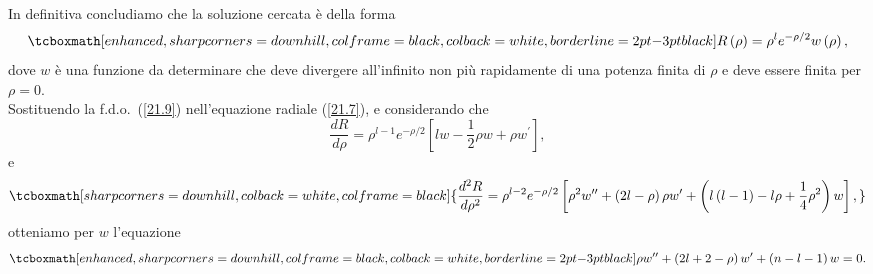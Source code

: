 In definitiva concludiamo che la soluzione cercata è della forma
	\begin{equation}
		\tcboxmath[enhanced, sharp corners=downhill, colframe=black, colback=white, borderline={2pt}{-3pt}{black}]{
			R\left(\rho\right)=\rho^le^{-\rho/2}w\left(\rho\right) ,
			}
	\label{21.9}
	\end{equation}
dove $w$ è una funzione da determinare che deve divergere all'infinito non più rapidamente di una potenza finita di $\rho$ e deve essere finita per $\rho=0$.\\

Sostituendo la f.d.o.~(\ref{21.9}) nell'equazione radiale (\ref{21.7}), e considerando che 
	\begin{equation}
		\frac{dR}{d\rho}=\rho^{l-1}e^{-\rho/2}[lw-\frac{1}{2}\rho w+\rho w^\prime] ,
	\end{equation}
e
	\begin{equation}
		\tcboxmath[sharp corners=downhill, colback=white, colframe=black]{
			\frac{d^2R}{d\rho^2}=\rho^{l-2}e^{-\rho/2}\left[\rho^2w^{\prime\prime}+\left(2l-\rho\right)\rho w^\prime+\left(l\left(l-1\right)-l\rho+\frac{1}{4}\rho^2\right)w\right] ,
			}
	\end{equation}
otteniamo per $w$ l'equazione
	\begin{equation}
		\tcboxmath[enhanced, sharp corners=downhill, colframe=black, colback=white, borderline={2pt}{-3pt}{black}]{
			\rho w^{\prime\prime}+\left(2l+2-\rho\right)w^\prime+\left(n-l-1\right)w=0 .
			}
	\end{equation}\\
	
